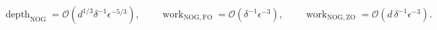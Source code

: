 \documentclass[12pt]{article}
\begin{document}
\[
 \operatorname{depth}_{\mathrm{NOG}}
 =\mathcal O\!\left(d^{1/3}\delta^{-1}\epsilon^{-5/3}\right),
 \qquad
 \operatorname{work}_{\mathrm{NOG,FO}}
 =\mathcal O\!\left(\delta^{-1}\epsilon^{-3}\right),
 \qquad
 \operatorname{work}_{\mathrm{NOG,ZO}}
 =\mathcal O\!\left(d\,\delta^{-1}\epsilon^{-3}\right).
\]
\end{document}
